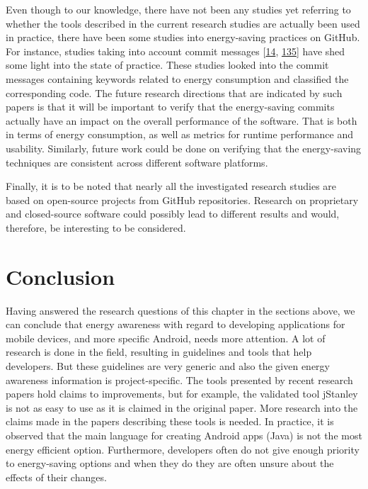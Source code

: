 \documentclass[]{book}
\begin{document}
Even though to our knowledge, there have not been any studies yet
referring to whether the tools described in the current research studies
are actually been used in practice, there have been some studies into
energy-saving practices on GitHub. For instance, studies taking into
account commit messages {[}\protect\hyperlink{ref-BLXWT2016}{14},
\protect\hyperlink{ref-MPEC2015}{135}{]} have shed some light into the
state of practice. These studies looked into the commit messages
containing keywords related to energy consumption and classified the
corresponding code. The future research directions that are indicated by
such papers is that it will be important to verify that the
energy-saving commits actually have an impact on the overall performance
of the software. That is both in terms of energy consumption, as well as
metrics for runtime performance and usability. Similarly, future work
could be done on verifying that the energy-saving techniques are
consistent across different software platforms.

Finally, it is to be noted that nearly all the investigated research
studies are based on open-source projects from GitHub repositories.
Research on proprietary and closed-source software could possibly lead
to different results and would, therefore, be interesting to be
considered.

\section{Conclusion}\label{conclusion-2}

Having answered the research questions of this chapter in the sections
above, we can conclude that energy awareness with regard to developing
applications for mobile devices, and more specific Android, needs more
attention. A lot of research is done in the field, resulting in
guidelines and tools that help developers. But these guidelines are very
generic and also the given energy awareness information is
project-specific. The tools presented by recent research papers hold
claims to improvements, but for example, the validated tool jStanley is
not as easy to use as it is claimed in the original paper. More research
into the claims made in the papers describing these tools is needed. In
practice, it is observed that the main language for creating Android
apps (Java) is not the most energy efficient option. Furthermore,
developers often do not give enough priority to energy-saving options
and when they do they are often unsure about the effects of their
changes.
\end{document}
